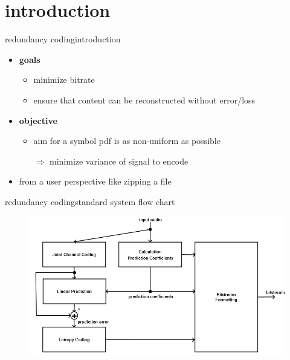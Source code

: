 


\subtitle{Part 24: Redundancy Coding}


	

\section[overview \& summary]{introduction}

	\begin{frame}{redundancy coding}{introduction}	
        \begin{itemize}
            \item   \textbf{goals}
                \begin{itemize}
                    \item minimize bitrate
                    \item ensure that content can be reconstructed without error/loss
                \end{itemize} 
            \bigskip
            \item<2->   \textbf{objective}
                \begin{itemize}
                    \item   aim for a symbol pdf is as non-uniform as possible
                    \item[$\Rightarrow$] minimize variance of signal to encode
                \end{itemize}
            \bigskip
            \item<3->   from a user perspective like zipping a file
        \end{itemize}
	\end{frame}

	\begin{frame}{redundancy coding}{standard system flow chart}
		\begin{figure}
			\centering
				\includegraphics[scale=0.4]{Graph/redundancycoding}
		\end{figure}
	\end{frame}


